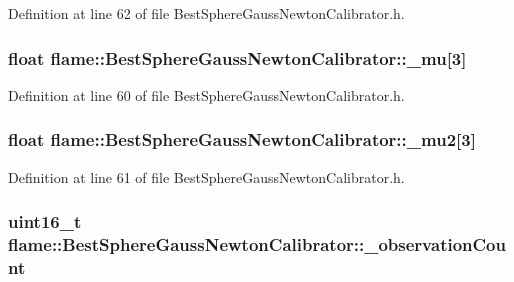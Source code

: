 Definition at line 62 of file Best\-Sphere\-Gauss\-Newton\-Calibrator.\-h.

\hypertarget{classflame_1_1_best_sphere_gauss_newton_calibrator_aba6bfd9041955afc010372868ba0666e}{
\subsubsection[{\-\_\-mu}]{\setlength{\rightskip}{0pt plus 5cm}float flame\-::\-Best\-Sphere\-Gauss\-Newton\-Calibrator\-::\-\_\-mu\mbox{[}3\mbox{]}\hspace{0.3cm}{\ttfamily [protected]}}}\label{classflame_1_1_best_sphere_gauss_newton_calibrator_aba6bfd9041955afc010372868ba0666e}


Definition at line 60 of file Best\-Sphere\-Gauss\-Newton\-Calibrator.\-h.

\hypertarget{classflame_1_1_best_sphere_gauss_newton_calibrator_a0fefa09292c75dbe4e4bd84c583abd4e}{
\subsubsection[{\-\_\-mu2}]{\setlength{\rightskip}{0pt plus 5cm}float flame\-::\-Best\-Sphere\-Gauss\-Newton\-Calibrator\-::\-\_\-mu2\mbox{[}3\mbox{]}\hspace{0.3cm}{\ttfamily [protected]}}}\label{classflame_1_1_best_sphere_gauss_newton_calibrator_a0fefa09292c75dbe4e4bd84c583abd4e}


Definition at line 61 of file Best\-Sphere\-Gauss\-Newton\-Calibrator.\-h.

\hypertarget{classflame_1_1_best_sphere_gauss_newton_calibrator_ababc262e831cf26e95a5cb1558d22801}{
\subsubsection[{\-\_\-observation\-Count}]{\setlength{\rightskip}{0pt plus 5cm}uint16\-\_\-t flame\-::\-Best\-Sphere\-Gauss\-Newton\-Calibrator\-::\-\_\-observation\-Count\hspace{0.3cm}{\ttfamily [protected]}}}\label{classflame_1_1_best_sphere_gauss_newton_calibrator_ababc262e831cf26e95a5cb1558d22801}


